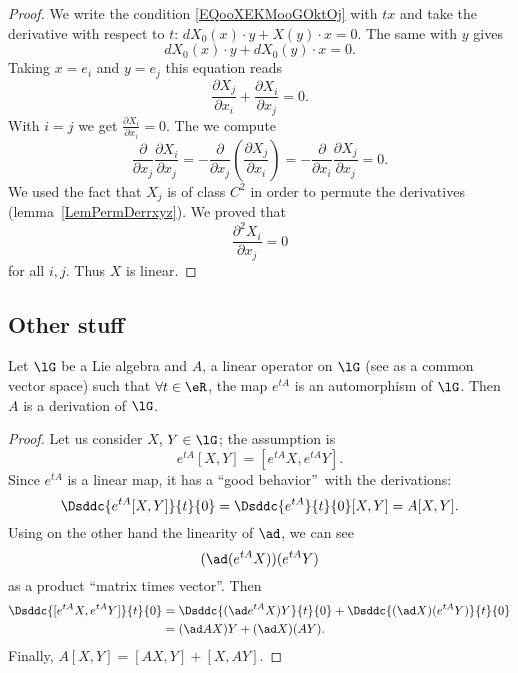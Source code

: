 \begin{theorem}
\begin{proof}
	We write the condition \eqref{EQooXEKMooGOktOj} with \( tx\) and take the derivative with respect to \( t\): \( dX_0(x)\cdot y+X(y)\cdot x=0\). The same with \( y\) gives
	\begin{equation}
		dX_0(x)\cdot y+dX_0(y)\cdot x=0.
	\end{equation}
	Taking \( x=e_i\) and \( y=e_j\) this equation reads
	\begin{equation}
		\frac{ \partial X_j }{ \partial x_i }+\frac{ \partial X_i }{ \partial x_j }=0.
	\end{equation}
	With \( i=j\) we get \( \frac{ \partial X_i }{ \partial x_i }=0\). The we compute
	\begin{equation}
		\frac{ \partial  }{ \partial x_j }\frac{ \partial X_i }{ \partial x_j }=-\frac{ \partial  }{ \partial x_j }\left( \frac{ \partial X_j }{ \partial x_i } \right)=-\frac{ \partial  }{ \partial x_i }\frac{ \partial X_j }{ \partial x_j }=0.
	\end{equation}
	We used the fact that \( X_j\) is of class \( C^2\) in order to permute the derivatives (lemma~\ref{LemPermDerrxyz}). We proved that
	\begin{equation}
		\frac{ \partial^2 X_i  }{ \partial x_j }=0
	\end{equation}
	for all \( i,j\). Thus \( X\) is linear.
\end{proof}

\subsection{Other stuff}



\begin{lemma}
	Let $\lG$ be a Lie algebra and $A$, a linear operator on $\lG$ (see as a common vector space) such that $\forall t\in\eR$, the map $e^{tA}$ is an automorphism of $\lG$. Then $A$ is a derivation of $\lG$.
	\label{lem:autom_derr}
\end{lemma}

\begin{proof}
	Let us consider $X$, $Y\in\lG$;  the assumption is
	\[
		e^{tA}[X,Y]=[e^{tA}X,e^{tA}Y].
	\]
	Since $e^{tA}$ is a linear map, it has a ``good behavior''\ with the derivations:
	\[
		\Dsddc{e^{tA}[X,Y]}{t}{0}=\Dsddc{e^{tA}}{t}{0}[X,Y]=A[X,Y].
	\]
	Using on the other hand the linearity of $\ad$, we can see
	\[
		(\ad(e^{tA}X))(e^{tA}Y)
	\]
	as a product ``matrix times vector''. Then
	\begin{equation}
		\begin{split}
			\Dsddc{[e^{tA}X,e^{tA}Y]}{t}{0}&=\Dsddc{(\ad e^{tA}X)Y}{t}{0}+\Dsddc{(\ad X)(e^{tA}Y)}{t}{0}\\
			&=(\ad AX)Y+(\ad X)(AY).
		\end{split}
	\end{equation}
	Finally, $A[X,Y]=[AX,Y]+[X,AY]$.


\end{proof}
\end{theorem}
